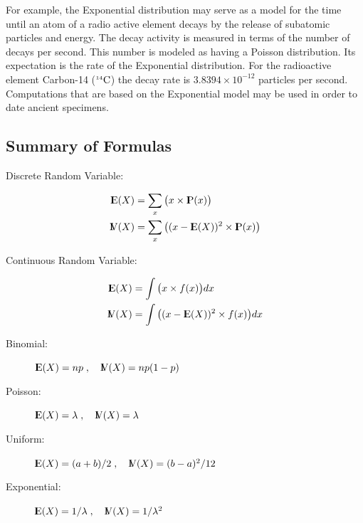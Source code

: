 \documentclass[]{krantz}
\newcommand{\Expec}{{\rm I\kern-.3em E}}
\newcommand{\Prob}{{\rm I\kern-.3em P}}
\newcommand{\Var}{{\rm I\kern-.3em V}}
\theoremstyle{definition}
\theoremstyle{definition}
\theoremstyle{definition}
\theoremstyle{remark}
\begin{document}
For example, the Exponential distribution may serve as a model for the
time until an atom of a radio active element decays by the release of
subatomic particles and energy. The decay activity is measured in terms
of the number of decays per second. This number is modeled as having a
Poisson distribution. Its expectation is the rate of the Exponential
distribution. For the radioactive element Carbon-14
(\({}^{\mbox{\tiny 14}}\mathrm{C}\)) the decay rate is
\(3.8394 \times 10^{-12}\) particles per second. Computations that are
based on the Exponential model may be used in order to date ancient
specimens.

\hypertarget{summary-of-formulas}{%
\subsection*{Summary of Formulas}\label{summary-of-formulas}}


\begin{description}
\item[Discrete Random Variable:]
\end{description}

\[\begin{aligned}
        \Expec(X) &= \sum_x \big(x \times \Prob(x)\big) \\
        \Var(X) &= \sum_x\big( (x-\Expec(X))^2 \times \Prob(x)\big) \end{aligned}\]

\begin{description}
\item[Continuous Random Variable:]
\end{description}

\[\begin{aligned}
        \Expec(X) &= \int \big(x \times f(x)\big)dx \\
        \Var(X) &= \int\big((x-\Expec(X))^2 \times f(x) \big) dx \end{aligned}\]

\begin{description}
\item[Binomial:]
\(\Expec(X) = n p \;, \quad \Var(X) = n p(1-p)\)
\item[Poisson:]
\(\Expec(X) = \lambda\;, \quad \Var(X) = \lambda\)
\item[Uniform:]
\(\Expec(X) = (a+b)/2\;, \quad \Var(X)= (b-a)^2/12\)
\item[Exponential:]
\(\Expec(X) = 1/\lambda\;, \quad \Var(X)= 1/\lambda^2\)
\end{description}
\end{document}
